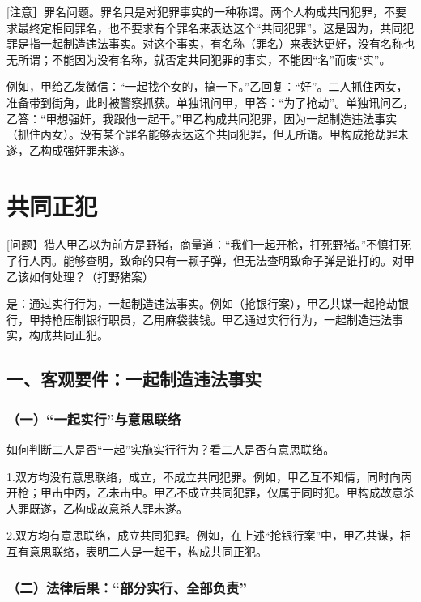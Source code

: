 [注意］罪名问题。罪名只是对犯罪事实的一种称谓。两个人构成共同犯罪，不要求最终定相同罪名，也不要求有个罪名来表达这个“共同犯罪”。这是因为，共同犯罪是指一起制造违法事实。对这个事实，有名称（罪名）来表达更好，没有名称也无所谓；不能因为没有名称，就否定共同犯罪的事实，不能因“名”而废“实”。

例如，甲给乙发微信：“一起找个女的，搞一下。”乙回复：“好”。二人抓住丙女，准备带到街角，此时被警察抓获。单独讯问甲，甲答：“为了抢劫”。单独讯问乙，乙答：“甲想强奸，我跟他一起干。”甲乙构成共同犯罪，因为一起制造违法事实（抓住丙女）。没有某个罪名能够表达这个共同犯罪，但无所谓。甲构成抢劫罪未遂，乙构成强奸罪未遂。

\section{共同正犯}

[问题】猎人甲乙以为前方是野猪，商量道：“我们一起开枪，打死野猪。”不慎打死了行人丙。能够查明，致命的只有一颗子弹，但无法查明致命子弹是谁打的。对甲乙该如何处理？（打野猪案）

是：通过实行行为，一起制造违法事实。例如（抢银行案），甲乙共谋一起抢劫银行，甲持枪压制银行职员，乙用麻袋装钱。甲乙通过实行行为，一起制造违法事实，构成共同正犯。


\subsection*{一、客观要件：一起制造违法事实}

\subsubsection*{（一）“一起实行”与意思联络}

如何判断二人是否“一起”实施实行行为？看二人是否有意思联络。

1.双方均没有意思联络，成立，不成立共同犯罪。例如，甲乙互不知情，同时向丙开枪；甲击中丙，乙未击中。甲乙不成立共同犯罪，仅属于同时犯。甲构成故意杀人罪既遂，乙构成故意杀人罪未遂。

2.双方均有意思联络，成立共同犯罪。例如，在上述“抢银行案”中，甲乙共谋，相互有意思联络，表明二人是一起干，构成共同正犯。

\subsubsection*{（二）法律后果：“部分实行、全部负责”}

